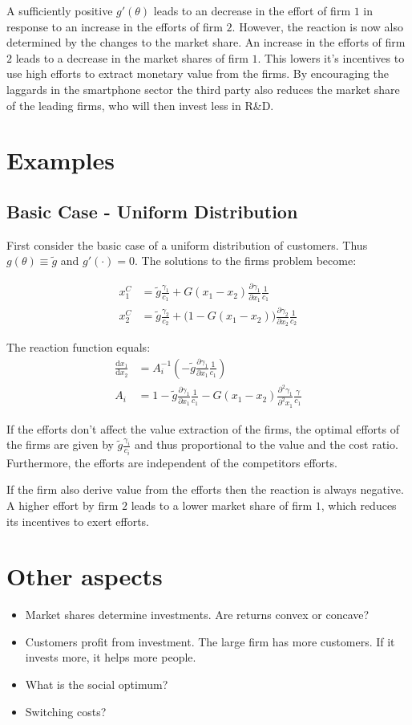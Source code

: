 \documentclass[a4paper, 11pt]{article}
\renewcommand{\d}{\text{d}}
\begin{document}
A sufficiently positive $g'(\theta)$ leads to an decrease in the effort of firm $1$ in response to an increase in the efforts of firm $2$. However, the reaction is now also determined by the changes to the market share. An increase in the efforts of firm $2$ leads to a decrease in the market shares of firm $1$. This lowers it's incentives to use high efforts to extract monetary value from the firms. By encouraging the laggards in the smartphone sector the third party also reduces the market share of the leading firms, who will then invest less in R\&D.

\section{Examples}
\subsection{Basic Case - Uniform Distribution}
First consider the basic case of a uniform distribution of customers. Thus $g(\theta)\equiv\tilde{g}$ and $g'(\cdot)=0$. The solutions to the firms problem become:

\begin{align}
x_1^C &= \tilde{g}\frac{\gamma_1}{c_1} + G(x_1-x_2)\frac{\partial \gamma_1}{\partial x_1}\frac{1}{c_1}\\
x_2^C &= \tilde{g}\frac{\gamma_2}{c_2} + \big(1-G(x_1-x_2)\big)\frac{\partial \gamma_2}{\partial x_2}\frac{1}{c_2}
\end{align}

The reaction function equals:
\begin{align*}
\frac{\d x_1}{\d x_2} &= A_i^{-1} \left( -\tilde{g}\frac{\partial \gamma_1}{\partial x_1}\frac{1}{c_1}\right)\\
A_i &= 1 -\tilde{g}\frac{\partial \gamma_1}{\partial x_1}\frac{1}{c_1}-G(x_1-x_2)\frac{\partial^2 \gamma_1}{\partial^2 x_1}\frac{\gamma}{c_1}
\end{align*}

If the efforts don't affect the value extraction of the firms, the optimal efforts of the firms are given by $\tilde{g}\frac{\gamma_i}{c_i}$ and thus proportional to the value and the cost ratio. Furthermore, the efforts are independent of the competitors efforts. 

If the firm also derive value from the efforts then the reaction is always negative. A higher effort by firm $2$ leads to a lower market share of firm $1$, which reduces its incentives to exert efforts. 


\section{Other aspects}
\begin{itemize}
	\item Market shares determine investments. Are returns convex or concave?
	\item Customers profit from investment. The large firm has more customers. If it invests more, it helps more people. 
	\item What is the social optimum?
	\item Switching costs?
\end{itemize}

 
\end{document}
